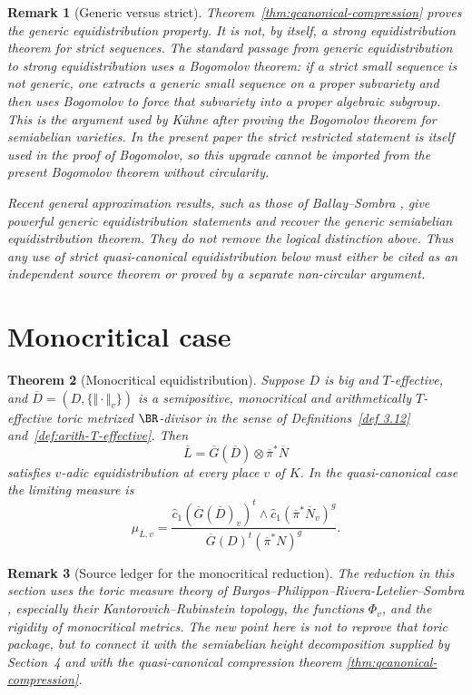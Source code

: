 \documentclass[10pt,a4paper]{amsart}
\theoremstyle{plain}
\newtheorem{theorem}{Theorem}
\newtheorem{remark}[theorem]{Remark}
\theoremstyle{plain}
\numberwithin{equation}{section}
\providecommand{\bD}{\overline{D}}
\providecommand{\bL}{\overline{L}}
\providecommand{\bN}{\overline{N}}
\begin{document}
\begin{remark}[Generic versus strict]\label{rem:qcanonical-generic-not-strict}
	Theorem~\ref{thm:qcanonical-compression} proves the generic equidistribution
	property.  It is not, by itself, a strong equidistribution theorem for strict
	sequences.  The standard passage from generic equidistribution to strong
	equidistribution uses a Bogomolov theorem: if a strict small sequence is not
	generic, one extracts a generic small sequence on a proper subvariety and then
	uses Bogomolov to force that subvariety into a proper algebraic subgroup.  This
	is the argument used by K\"uhne after proving the Bogomolov theorem for
	semiabelian varieties.  In the present paper the strict restricted statement
	is itself used in the proof of Bogomolov, so this upgrade cannot be imported
	from the present Bogomolov theorem without circularity.
	
	Recent general approximation results, such as those of Ballay--Sombra
	\cite{BS24}, give powerful generic equidistribution statements and recover the
	generic semiabelian equidistribution theorem.  They do not remove the logical
	distinction above.  Thus any use of strict quasi-canonical equidistribution
	below must either be cited as an independent source theorem or proved by a
	separate non-circular argument.
\end{remark}


\section{Monocritical case}

\begin{theorem}[Monocritical equidistribution]
	\label{thm:monocritical-eq}
	Suppose \(D\) is big and \(T\)-effective, and
	\(\bD=(D,\{\Vert\cdot\Vert_v\})\) is a semipositive, monocritical and
	arithmetically \(T\)-effective toric metrized \(\BR\)-divisor in the sense of
	Definitions~\ref{def 3.12} and~\ref{def:arith-T-effective}.  Then
	\[
	\bL=\overline G(\bD)\otimes\overline\pi^*\bN
	\]
	satisfies \(v\)-adic equidistribution at every place \(v\) of \(K\).  In the
	quasi-canonical case the limiting measure is
	\[
	\mu_{\bL,v}
	=
	\frac{
		\hat c_1(\overline G(\bD)_v)^t\wedge
		\hat c_1(\overline\pi^*\bN_v)^g
	}{
		\overline G(D)^t(\overline\pi^*N)^g
	}.
	\]
\end{theorem}

\begin{remark}[Source ledger for the monocritical reduction]
	\label{rem:monocritical-source-ledger}
	The reduction in this section uses the toric measure theory of
	Burgos--Philippon--Rivera-Letelier--Sombra \cite{BGPS19}, especially their
	Kantorovich--Rubinstein topology, the functions \(\Phi_v\), and the rigidity of
	monocritical metrics.  The new point here is not to reprove that toric package,
	but to connect it with the semiabelian height decomposition supplied by
	Section~4 and with the quasi-canonical compression theorem
	\ref{thm:qcanonical-compression}.
\end{remark}
\end{document}
